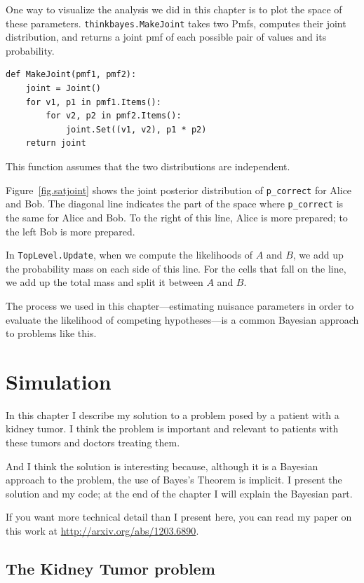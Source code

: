 \documentclass[12pt]{book}
\begin{document}
One way to visualize the analysis we did in this chapter is
to plot the space of these parameters.  \verb"thinkbayes.MakeJoint"
takes two Pmfs, computes their joint distribution, and returns
a joint pmf of each possible pair of values and its probability.

\begin{verbatim}
def MakeJoint(pmf1, pmf2):
    joint = Joint()
    for v1, p1 in pmf1.Items():
        for v2, p2 in pmf2.Items():
            joint.Set((v1, v2), p1 * p2)
    return joint
\end{verbatim}

This function assumes that the two distributions are independent.

Figure~\ref{fig.satjoint} shows the joint posterior distribution of
\verb"p_correct" for Alice and Bob.  The diagonal line indicates the
part of the space where \verb"p_correct" is the same for Alice and
Bob.  To the right of this line, Alice is more prepared; to the left
Bob is more prepared.

In {\tt TopLevel.Update}, when we compute the likelihoods of $A$ and
$B$, we add up the probability mass on each side of this line.  For the
cells that fall on the line, we add up the total mass and split it
between $A$ and $B$.

The process we used in this chapter---estimating nuisance
parameters in order to evaluate the likelihood of competing
hypotheses---is a common Bayesian approach to problems like this.




\chapter{Simulation}

In this chapter I describe my solution to a problem posed
by a patient with a kidney tumor.  I think the problem is 
important and relevant to patients with these tumors
and doctors treating them.

And I think the solution is interesting because, although it
is a Bayesian approach to the problem, the use of Bayes's Theorem
is implicit.  I present the solution and my code; at the end
of the chapter I will explain the Bayesian part.

If you want more technical detail than I present here, you can
read my paper on this work at \url{http://arxiv.org/abs/1203.6890}.


\section{The Kidney Tumor problem}
\end{document}
